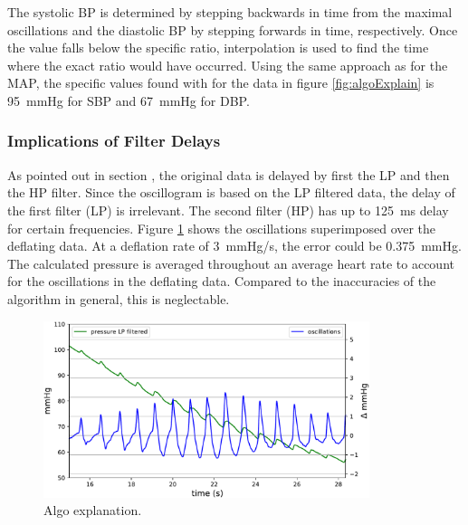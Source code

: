 The systolic BP is determined by stepping backwards in time from the maximal oscillations and the diastolic BP by stepping forwards in time, respectively. Once the value falls below the specific ratio, interpolation is used to find the time where the exact ratio would have occurred. Using the same approach as for the MAP, the specific values found with  for the data in figure \ref{fig:algoExplain} is \SI{95}{\mmHg} for SBP and \SI{67}{\mmHg} for DBP.


\subsubsection{Implications of Filter Delays}\label{sec:impfilt}
As pointed out in section , the original data is delayed by first the LP and then the HP filter. Since the oscillogram is based on the LP filtered data, the delay of the first filter (LP) is irrelevant. The second filter (HP) has up to \SI{125}{\milli\second} delay for certain frequencies. Figure \ref{fig:algoDetail} shows the oscillations superimposed over the deflating data. At a deflation rate of \SI{3}{\mmHg/\second}, the error could be \SI{0.375}{\mmHg}. The calculated pressure is averaged throughout an average heart rate to account for the oscillations in the deflating data. Compared to the inaccuracies of the algorithm in general, this is neglectable. 


\begin{figure}[ht]
\centering
\includegraphics[width=0.85\textwidth]{figures/algo_detail.pdf}
\caption{Algo explanation.}
\label{fig:algoDetail}
\end{figure}
